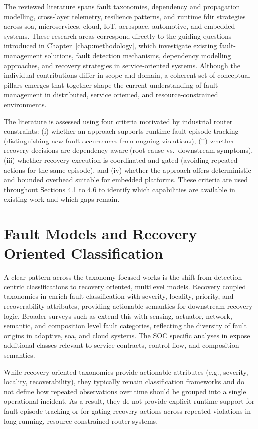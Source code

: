 The reviewed literature spans fault taxonomies, dependency and propagation modelling, cross-layer telemetry, resilience patterns, and runtime \gls{fdir} strategies across \gls{soa}, microservices, cloud, IoT, aerospace, automotive, and embedded systems. These research areas correspond directly to the guiding questions introduced in Chapter~\ref{chap:methodology}, which investigate existing fault-management solutions, fault detection mechanisms, dependency modelling approaches, and recovery strategies in service-oriented systems. Although the individual contributions differ in scope and domain, a coherent set of conceptual pillars emerges that together shape the current understanding of fault management in distributed, service oriented, and resource-constrained environments.

The literature is assessed using four criteria motivated by industrial router constraints: (i) whether an approach supports runtime fault episode tracking (distinguishing new fault occurrences from ongoing violations), (ii) whether recovery decisions are dependency-aware (root cause vs.\ downstream symptoms), (iii) whether recovery execution is coordinated and gated (avoiding repeated actions for the same episode), and (iv) whether the approach offers deterministic and bounded overhead suitable for embedded platforms. These criteria are used throughout Sections 4.1 to 4.6 to identify which capabilities are available in existing work and which gaps remain.

\section{Fault Models and Recovery Oriented Classification}\label{sec:lit-fault-models}

A clear pattern across the taxonomy focused works is the shift from detection centric classifications to recovery oriented, multilevel models. Recovery coupled taxonomies in \cite{ref1,ref2} enrich fault classification with severity, locality, priority, and recoverability attributes, providing actionable semantics for downstream recovery logic. Broader surveys such as \cite{ref3,ref4} extend this with sensing, actuator, network, semantic, and composition level fault categories, reflecting the diversity of fault origins in adaptive, \gls{soa}, and cloud systems. The SOC specific analyses in \cite{ref5,ref6} expose additional classes relevant to service contracts, control flow, and composition semantics.

While recovery-oriented taxonomies provide actionable attributes (e.g., severity, locality, recoverability), they typically remain classification frameworks and do not define how repeated observations over time should be grouped into a single operational incident. As a result, they do not provide explicit runtime support for fault episode tracking or for gating recovery actions across repeated violations in long-running, resource-constrained router systems.

